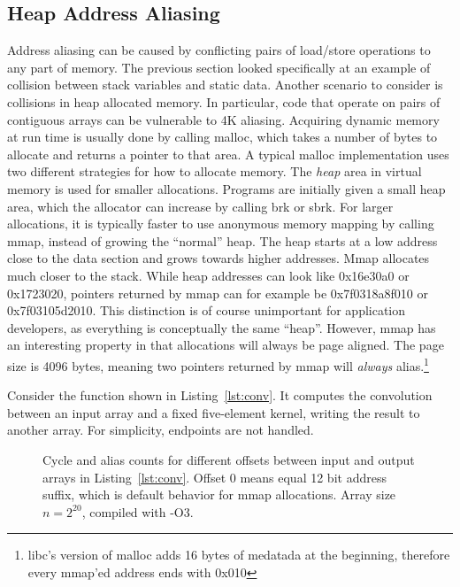 \documentclass[a4paper,10pt,twocolumn,twoside]{article}
\begin{document}
\subsection{Heap Address Aliasing}
Address aliasing can be caused by conflicting pairs of load/store operations to any part of memory.
The previous section looked specifically at an example of collision between stack variables and static data.
Another scenario to consider is collisions in heap allocated memory.
In particular, code that operate on pairs of contiguous arrays can be vulnerable to 4K aliasing.
Acquiring dynamic memory at run time is usually done by calling malloc, which takes a number of bytes to allocate and returns a pointer to that area.
A typical malloc implementation uses two different strategies for how to allocate memory.
The \emph{heap} area in virtual memory is used for smaller allocations.
Programs are initially given a small heap area, which the allocator can increase by calling brk or sbrk.
For larger allocations, it is typically faster to use anonymous memory mapping by calling mmap, instead of growing the ``normal'' heap.
The heap starts at a low address close to the data section and grows towards higher addresses. 
Mmap allocates much closer to the stack.
While heap addresses can look like 0x16e30a0 or 0x1723020, pointers returned by mmap can for example be 0x7f0318a8f010 or 0x7f03105d2010.
This distinction is of course unimportant for application developers, as everything is conceptually the same ``heap''.
However, mmap has an interesting property in that allocations will always be page aligned.
The page size is 4096 bytes, meaning two pointers returned by mmap will \emph{always} alias.\footnote{libc's version of malloc adds 16 bytes of medatada at the beginning, therefore every mmap'ed address ends with 0x010}

Consider the function shown in Listing~\ref{lst:conv}.
It computes the convolution between an input array and a fixed five-element kernel, writing the result to another array.
For simplicity, endpoints are not handled.

\begin{figure}[t]
  \caption{Cycle and alias counts for different offsets between input and output arrays in Listing~\ref{lst:conv}. Offset 0 means equal 12 bit address suffix, which is default behavior for mmap allocations. Array size $n=2^{20}$, compiled with -O3. }
  \label{fig:heapalias}
\end{figure}
\end{document}
